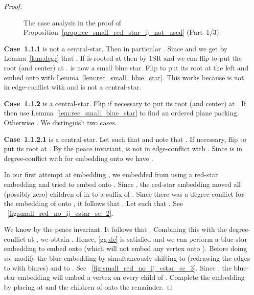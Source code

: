 \documentclass[11pt,a4paper,colorlinks=true,urlcolor=blue,citecolor=red]{article}
\theoremstyle{plain}
\newcommand{\case}[1]{\par\vspace{.5\baselineskip}\noindent\textbf{\sffamily Case~#1}}
\begin{document}
\begin{proof}
  \begin{figure}[b]
    \centering\hfil {}\hfil {}\hfil {}\hfil \label{fig:small_red_no_ij_1}
    \caption{The case analysis in the proof of
      Proposition~\ref{prop:rec_small_red_star_ij_not_used} (Part~1/3).}
  \end{figure}

  \case{1.1.1}  is not a central-star. Then in particular
  . Since  and
   we get by Lemma~\ref{lem:degr} that
  . If  is rooted at  then
   by 1SR and we can flip  to put the
  root (and center) at .  is now a small blue star.
  Flip  to put its root at the left and embed  onto
   with Lemma~\ref{lem:rec_small_blue_star}. This works because
   is not in edge-conflict with  and  is not a
  central-star.

  \case{1.1.2}  is a central-star. Flip  if
  necessary to put its root (and center) at . If
   then use Lemma~\ref{lem:rec_small_blue_star} to
  find an ordered plane packing. Otherwise . We
  distinguish two cases.

  \case{1.1.2.1}  is a central-star. Let  such that
   and note that . If necessary, flip
   to put its root at . By the peace invariant,  is not in
  edge-conflict with . Since  is in degree-conflict with  for
  embedding  onto  we have .

  In our first attempt at embedding , we embedded  from  using
  a red-star embedding and tried to embed  onto .  Since
  , the red-star embedding moved all (possibly zero) children
  of  in  to a suffix of . Since there was a
  degree-conflict for the embedding of  onto , it follows
  that . Let  such that
  . See
  \figurename~\ref{fig:small_red_no_ij_cstar_sc_2}.

  We know  by the peace invariant. It
  follows that .  Combining this
  with the degree-conflict at , we obtain
  .
  Hence, \ref{gg:dc} is satisfied and we can perform a blue-star
  embedding to embed  onto  (which will not embed any vertex
  onto ). Before doing so, modify the blue embedding by
  simultaneously shifting  to  (redrawing the
  edges to  with biarcs) and  to . See
  \figurename~\ref{fig:small_red_no_ij_cstar_sc_3}. Since
  , the blue-star embedding will embed a
  vertex on every child of . Complete the embedding by
  placing  at  and the children of  onto the remainder.


\end{proof}
\end{document}
